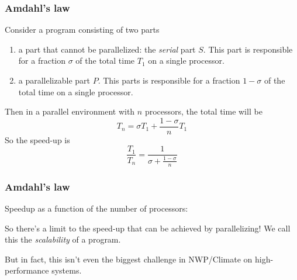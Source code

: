 \documentclass[aspectratio=43,9pt]{beamer}
\begin{document}
\begin{frame}
	\frametitle{Amdahl's law}
	\begin{myitemize}{2ex}
		\item Consider a program consisting of two parts
			\begin{enumerate}\vspace*{2ex}
				\item a part that cannot be parallelized: the \emph{serial} part $S$. This part is responsible for a fraction $\sigma$ of the total time $T_1$ on a single processor.\vspace*{2ex}
				\item a parallelizable part $P$. This parts is responsible for a fraction $1-\sigma$ of the total time on a single processor.
			\end{enumerate}
		\item Then in a parallel environment with $n$ processors, the total time will be
			\begin{equation*}
				T_n=\sigma T_1 + \frac{1-\sigma}{n} T_1
			\end{equation*}
			So the speed-up is
			\begin{equation*}
				\frac{T_1}{T_n}=\frac{1}{\sigma + \frac{1-\sigma}{n}}
			\end{equation*}
	\end{myitemize}
\end{frame}
%
%
\begin{frame}
	\frametitle{Amdahl's law}
	\begin{myitemize}{2ex}
		\item Speedup as a function of the number of processors:
			\begin{center}
				\scalebox{.5}{}
			\end{center}
		\item So there's a limit to the speed-up that can be achieved by parallelizing! We call this the \emph{scalability} of a program.
	\pause
		\item But in fact, this isn't even the biggest challenge in NWP/Climate on high-performance systems.
	\end{myitemize}
\end{frame}
%
%
\end{document}
